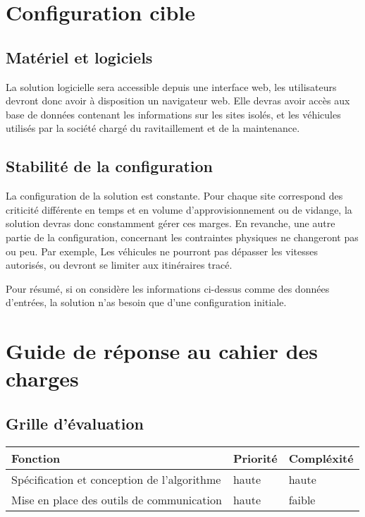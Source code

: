 \section{Configuration cible}

    \subsection{Matériel et logiciels}

        La solution logicielle sera accessible depuis une interface web, les utilisateurs devront donc avoir à disposition un navigateur web.
        Elle devras avoir accès aux base de données contenant les informations sur les sites isolés, et les véhicules utilisés par la société chargé du ravitaillement et de la maintenance.
    
    \subsection{Stabilité de la configuration}
    
        La configuration de la solution est constante. Pour chaque site correspond des criticité différente en temps et en volume d'approvisionnement ou de vidange, la solution devras donc constamment gérer ces marges.
        En revanche, une autre partie de la configuration, concernant les contraintes physiques ne changeront pas ou peu. Par exemple, Les véhicules ne pourront pas dépasser les vitesses autorisés, ou devront se limiter aux itinéraires tracé.
        
        Pour résumé, si on considère les informations ci-dessus comme des données d'entrées, la solution n'as besoin que d'une configuration initiale.

\section{Guide de réponse au cahier des charges}

    \subsection{Grille d'évaluation}
        
        \begin{tabular}{l l l}
            \hline
            Fonction & Priorité & Compléxité \\
            \hline
            Spécification et conception de l'algorithme & haute & haute \\
            Mise en place des outils de communication & haute & faible \\
            \hline
            
        \end{tabular}

